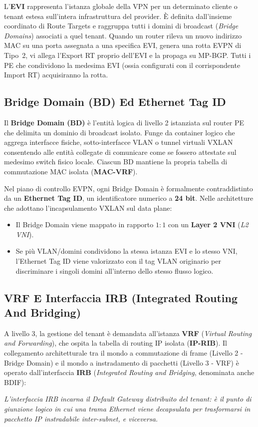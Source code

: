 \documentclass[11pt, a4paper]{article}
\begin{document}
L'\textbf{EVI} rappresenta l'istanza globale della VPN per un determinato cliente o tenant estesa sull'intera infrastruttura del provider. È definita dall'insieme coordinato di Route Targets e raggruppa tutti i domini di broadcast (\emph{Bridge Domains}) associati a quel tenant. Quando un router rileva un nuovo indirizzo MAC su una porta assegnata a una specifica EVI, genera una rotta EVPN di Tipo~2, vi allega l'Export RT proprio dell'EVI e la propaga su MP-BGP. Tutti i PE che condividono la medesima EVI (ossia configurati con il corrispondente Import RT) acquisiranno la rotta.

\subsection{Bridge Domain (BD) Ed Ethernet Tag ID}

Il \textbf{Bridge Domain (BD)} è l'entità logica di livello 2 istanziata sul router PE che delimita un dominio di broadcast isolato. Funge da container logico che aggrega interfacce fisiche, sotto-interfacce VLAN o tunnel virtuali VXLAN consentendo alle entità collegate di comunicare come se fossero attestate sul medesimo switch fisico locale. Ciascun BD mantiene la propria tabella di commutazione MAC isolata (\textbf{MAC-VRF}).

Nel piano di controllo EVPN, ogni Bridge Domain è formalmente contraddistinto da un \textbf{Ethernet Tag ID}, un identificatore numerico a \textbf{24 bit}. Nelle architetture che adottano l'incapsulamento VXLAN sul data plane:
\begin{itemize}[noitemsep]
    \item Il Bridge Domain viene mappato in rapporto $1:1$ con un \textbf{Layer 2 VNI} (\emph{L2 VNI}).
    \item Se più VLAN/domini condividono la stessa istanza EVI e lo stesso VNI, l'Ethernet Tag ID viene valorizzato con il tag VLAN originario per discriminare i singoli domini all'interno dello stesso flusso logico.
\end{itemize}

\subsection{VRF E Interfaccia IRB (Integrated Routing And Bridging)}

A livello 3, la gestione del tenant è demandata all'istanza \textbf{VRF} (\emph{Virtual Routing and Forwarding}), che ospita la tabella di routing IP isolata (\textbf{IP-RIB}). Il collegamento architetturale tra il mondo a commutazione di frame (Livello 2 - Bridge Domain) e il mondo a instradamento di pacchetti (Livello 3 - VRF) è operato dall'interfaccia \textbf{IRB} (\emph{Integrated Routing and Bridging}, denominata anche BDIF):
\begin{center}
\emph{L'interfaccia IRB incarna il Default Gateway distribuito del tenant: è il punto di giunzione logico in cui una trama Ethernet viene decapsulata per trasformarsi in pacchetto IP instradabile inter-subnet, e viceversa.}
\end{center}
\end{document}
